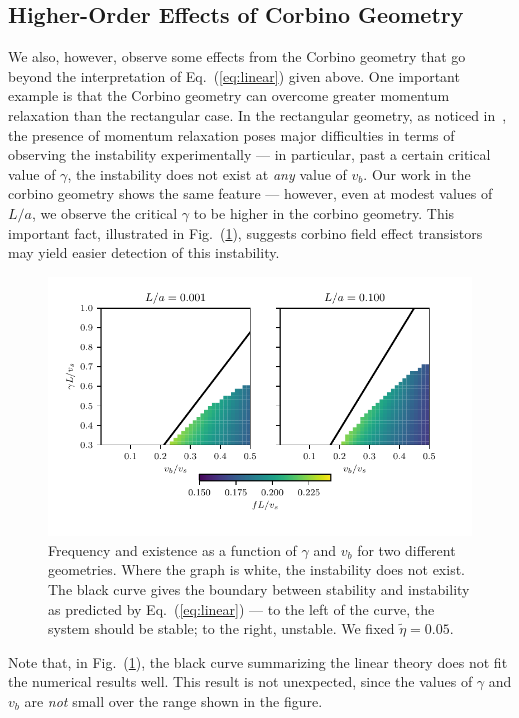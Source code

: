 \documentclass[12pt]{article}
\begin{document}
\subsection{Higher-Order Effects of Corbino Geometry}
We also, however, observe some effects from the Corbino geometry that go beyond the interpretation of Eq.~(\ref{eq:linear}) given above.  One important example is that the Corbino geometry can overcome greater momentum relaxation than the rectangular case.  In the rectangular geometry, as noticed in~\cite{Mendl2019}, the presence of momentum relaxation poses major difficulties in terms of observing the instability experimentally --- in particular, past a certain critical value of $\gamma$, the instability does not exist at \textit{any} value of $v_b$.  Our work in the corbino geometry shows the same feature --- however, even at modest values of $L/a$, we observe the critical $\gamma$ to be higher in the corbino geometry.  This important fact, illustrated in Fig.~(\ref{fig:v0_gamma}), suggests corbino field effect transistors may yield easier detection of this instability.
\begin{figure}[ht]
	\centering
	\includegraphics{Figures/v0_gamma0_freq.pdf}
	\caption{Frequency and existence as a function of $\gamma$ and $v_b$ for two different geometries.  Where the graph is white, the instability does not exist.  The black curve gives the boundary between stability and instability as predicted by Eq.~(\ref{eq:linear}) --- to the left of the curve, the system should be stable; to the right, unstable.  We fixed $\tilde{\eta}=0.05$.}\label{fig:v0_gamma}
\end{figure}
Note that, in Fig.~(\ref{fig:v0_gamma}), the black curve summarizing the linear theory does not fit the numerical results well.  This result is not unexpected, since the values of $\gamma$ and $v_b$ are \textit{not} small over the range shown in the figure.
\end{document}
